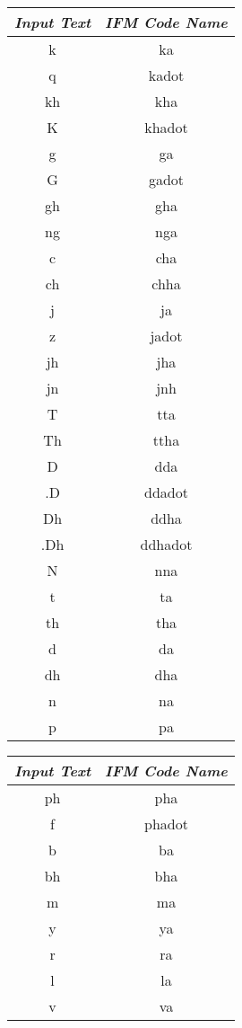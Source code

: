 \documentclass[11pt]{article}
\begin{document}
\begin{figure}
\begin{center}
\begin{tabular}{|c|c|}
\hline
{\em Input Text}	& {\em IFM Code Name}\\ \hline \hline
k	& ka	\\ \hline
q	& kadot	\\ \hline
kh	& kha	\\ \hline
K	& khadot	\\ \hline
g	& ga	\\ \hline
G	& gadot	\\ \hline
gh	& gha	\\ \hline
ng	& nga	\\ \hline
c	& cha	\\ \hline
ch	& chha	\\ \hline
j	& ja	\\ \hline
z	& jadot	\\ \hline
jh	& jha	\\ \hline
jn	& jnh	\\ \hline
T	& tta	\\ \hline
Th	& ttha	\\ \hline
D	& dda	\\ \hline
.D	& ddadot	\\ \hline
Dh	& ddha	\\ \hline
.Dh	& ddhadot	\\ \hline
N	& nna	\\ \hline
t	& ta	\\ \hline
th	& tha	\\ \hline
d	& da	\\ \hline
dh	& dha	\\ \hline
n	& na	\\ \hline
p	& pa	\\ \hline
\end{tabular}
\hfill
\begin{tabular}{|c|c|}
\hline
{\em Input Text}	& {\em IFM Code Name}\\ \hline \hline
ph	& pha	\\ \hline
f	& phadot	\\ \hline
b	& ba	\\ \hline
bh	& bha	\\ \hline
m	& ma	\\ \hline
y	& ya	\\ \hline
r	& ra	\\ \hline
l	& la	\\ \hline
v	& va	\\ \hline

\end{tabular}
\end{center}
\end{figure}
\end{document}
